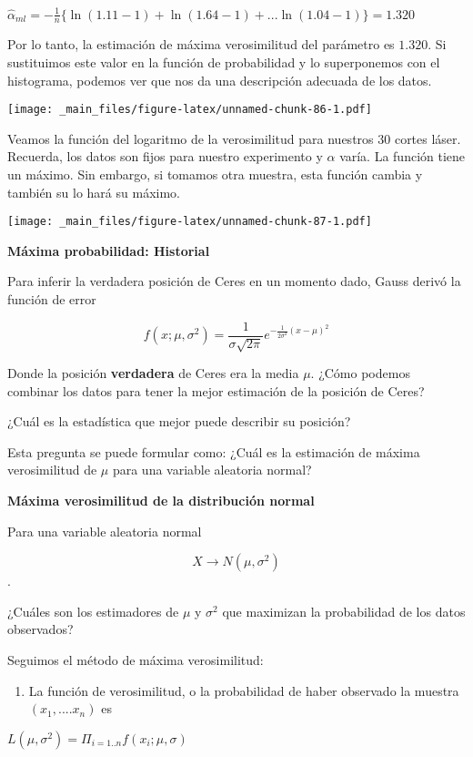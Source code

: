 \documentclass[
]{book}
\providecommand{\tightlist}{%
  \setlength{\itemsep}{0pt}\setlength{\parskip}{0pt}}
\begin{document}
\(\hat{\alpha}_{ml}=-\frac{1}{n}\{ \ln (1.11-1)+ \ln (1.64-1)+...\ln (1.04-1)\}=1.320\)

Por lo tanto, la estimación de máxima verosimilitud del parámetro es \(1.320\). Si sustituimos este valor en la función de probabilidad y lo superponemos con el histograma, podemos ver que nos da una descripción adecuada de los datos.

\texttt{[image: \_main\_files/figure-latex/unnamed-chunk-86-1.pdf]}

Veamos la función del logaritmo de la verosimilitud para nuestros \(30\) cortes láser. Recuerda, los datos son fijos para nuestro experimento y \(\alpha\) varía. La función tiene un máximo. Sin embargo, si tomamos otra muestra, esta función cambia y también su lo hará su máximo.

\texttt{[image: \_main\_files/figure-latex/unnamed-chunk-87-1.pdf]}

\textbf{Máxima probabilidad: Historial}

Para inferir la verdadera posición de Ceres en un momento dado, Gauss derivó la función de error

\[f(x; \mu, \sigma^2)= \frac{1}{\sigma \sqrt{2 \pi}} e^{-\frac{1}{2\sigma^2} (x- \mu)^2}\]

Donde la posición \textbf{verdadera} de Ceres era la media \(\mu\). ¿Cómo podemos combinar los datos para tener la mejor estimación de la posición de Ceres?

¿Cuál es la estadística que mejor puede describir su posición?

Esta pregunta se puede formular como: ¿Cuál es la estimación de máxima verosimilitud de \(\mu\) para una variable aleatoria normal?

\textbf{Máxima verosimilitud de la distribución normal}

Para una variable aleatoria normal

\[X \rightarrow N(\mu, \sigma^2)\].

¿Cuáles son los estimadores de \(\mu\) y \(\sigma^2\) que maximizan la probabilidad de los datos observados?

Seguimos el método de máxima verosimilitud:

\begin{enumerate}
\def\labelenumi{\arabic{enumi}.}
\tightlist
\item
  La función de verosimilitud, o la probabilidad de haber observado la muestra \((x_1, ....x_n)\) es
\end{enumerate}

\(L(\mu, \sigma^2)=\Pi_{i=1..n} f(x_i;\mu,\sigma)\)
\end{document}
